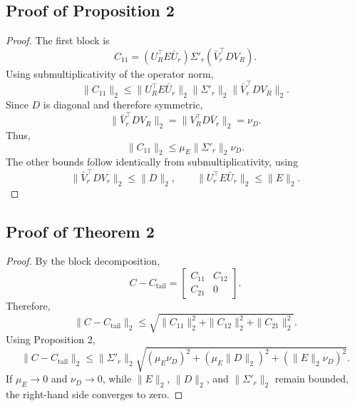 \subsection{Proof of Proposition 2}
\label{app:proof-proposition-2-scaler-induces-mixing-bounds}
\begin{proof}
The first block is
\[
C_{11}
=
(U_R^\top E \bar{U}_r)\Sigma'_r(\bar{V}_r^\top D V_R).
\]
Using submultiplicativity of the operator norm,
\[
\|C_{11}\|_2
\leq
\|U_R^\top E \bar{U}_r\|_2
\|\Sigma'_r\|_2
\|\bar{V}_r^\top D V_R\|_2 .
\]
Since $D$ is diagonal and therefore symmetric,
\[
\|\bar{V}_r^\top D V_R\|_2
=
\|V_R^\top D \bar{V}_r\|_2
=
\nu_D .
\]
Thus,
\[
\|C_{11}\|_2
\leq
\mu_E \|\Sigma'_r\|_2 \nu_D .
\]
The other bounds follow identically from submultiplicativity, using
\[
\|\bar{V}_r^\top D V_r\|_2 \leq \|D\|_2,
\qquad
\|U_r^\top E \bar{U}_r\|_2 \leq \|E\|_2 .
\]
\end{proof}


\subsection{Proof of Theorem 2}
\label{app:proof-thm-2-approximate-tail-preservation}
\begin{proof}
By the block decomposition,
\[
C-C_{\mathrm{tail}}
=
\begin{bmatrix}
C_{11} & C_{12} \\
C_{21} & 0
\end{bmatrix}.
\]
Therefore,
\[
\|C-C_{\mathrm{tail}}\|_2
\leq
\sqrt{
\|C_{11}\|_2^2
+
\|C_{12}\|_2^2
+
\|C_{21}\|_2^2
}.
\]
Using Proposition 2,
\[
\|C-C_{\mathrm{tail}}\|_2
\leq
\|\Sigma'_r\|_2
\sqrt{
(\mu_E\nu_D)^2
+
(\mu_E\|D\|_2)^2
+
(\|E\|_2\nu_D)^2
}.
\]
If $\mu_E\to 0$ and $\nu_D\to 0$, while $\|E\|_2$, $\|D\|_2$, and
$\|\Sigma'_r\|_2$ remain bounded, the right-hand side converges to zero.
\end{proof}

